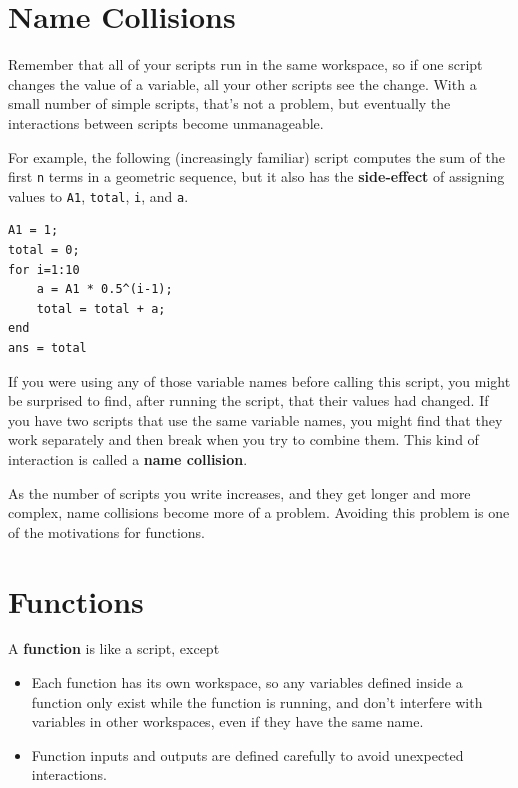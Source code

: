 \documentclass[
]{book}
\begin{document}
\section{Name Collisions}

Remember that all of your scripts run in the same workspace, so
if one script changes the value of a variable, all your other
scripts see the change.  With a small number of simple scripts,
that's not a problem, but eventually the interactions between
scripts become unmanageable.

For example, the following (increasingly familiar) script computes the
sum of the first {\tt n} terms in a geometric sequence, but it also
has the {\bf side-effect} of assigning values to {\tt A1}, {\tt total},
{\tt i}, and {\tt a}.

\begin{verbatim}
A1 = 1;
total = 0;
for i=1:10
    a = A1 * 0.5^(i-1);
    total = total + a;
end
ans = total
\end{verbatim}

If you were using any of those variable names before calling this
script, you might be surprised to find, after running the script,
that their values had changed.  If you have two scripts that use
the same variable names, you might find that they work separately
and then break when you try to combine them.  This kind of
interaction is called a {\bf name collision}.

As the number of scripts you write increases, and they get longer
and more complex, name collisions become more of a problem.  Avoiding
this problem is one of the motivations for functions.


\section{Functions}
\label{sect:functions}

A {\bf function} is like a script, except

\begin{itemize}

\item Each function has its own workspace, so any variables defined
inside a function only exist while the function is running, and don't
interfere with variables in other workspaces, even if they have the
same name.

\item Function inputs and outputs are defined carefully to avoid
unexpected interactions.

\end{itemize}
\end{document}
